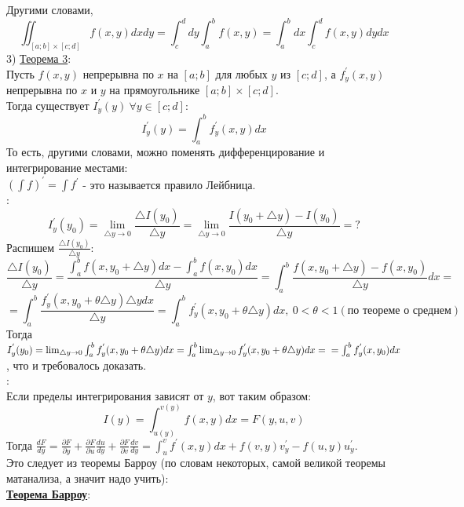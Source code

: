 \documentclass[12pt]{article}
\begin{document}
Другими словами,\\ $$\iint_{[a;b]\times [c;d]} f(x,y) dxdy = \int_c^d dy \int_a^b f(x,y) = \int_a^b dx \int_c^d f(x,y) dydx$$
3) \uline{Теорема 3}:\\
Пусть $f(x,y)$ непрерывна по $x$ на $[a;b]$ для любых $y$ из $[c;d]$, а $f^{'}_y(x,y)$ непрерывна по $x$ и $y$ на прямоугольнике $[a;b] \times [c;d]$.\\
Тогда существует $I^{'}_y (y) \ \forall y\in [c;d]$:\\
$$I^{'}_y (y) = \int_a^b f^{'}_y (x,y) dx$$
То есть, другими словами, можно поменять дифференцирование и интегрирование местами:\\
$(\int f)^{'} = \int f^{'}$ - это называется правило Лейбница.\\
:\\
$$I^{'}_y(y_0) = \lim_{{\bigtriangleup y} \to 0} \frac{{\bigtriangleup I(y_0)}}{{\bigtriangleup y}} = \lim_{{\bigtriangleup y} \to 0} \frac{I(y_0+{\bigtriangleup y}) - I(y_0)}{{\bigtriangleup y}} = ?$$
Распишем $\frac{{\bigtriangleup I(y_0)}}{{\bigtriangleup y}}$:\\
$$\frac{{\bigtriangleup I(y_0)}}{{\bigtriangleup y}} = \frac{\int_a^b f(x, y_0 + {\bigtriangleup y}) dx - \int_a^b f(x,y_0) dx}{{\bigtriangleup y}} = \int_a^b \frac{f(x,y_0+{\bigtriangleup y}) - f(x,y_0)}{{\bigtriangleup y}} dx =$$
$$= \int_a^b \frac{f^{'}_y (x, y_0 + \theta {\bigtriangleup y}) {\bigtriangleup y} dx}{{\bigtriangleup y}} = \int_a^b f^{'}_y (x, y_0 + \theta {\bigtriangleup y}) dx, \ 0 < \theta < 1 (\text{по теореме о среднем})$$
Тогда $I^{'}_y (y_0) = \lim_{{\bigtriangleup y} \to 0} \int_a^b f^{'}_y (x, y_0 + \theta {\bigtriangleup y}) dx = \int_a^b \lim_{{\bigtriangleup y} \to 0}  f^{'}_y (x, y_0 + \theta {\bigtriangleup y}) dx =\\= \int_a^b f^{'}_y (x,y_0) dx$, что и требовалось доказать.\\
:\\
Если пределы интегрирования зависят от $y$, вот таким образом:\\
$$I(y) = \int_{u(y)}^{v(y)} f(x,y) dx = F(y,u,v)$$
Тогда $\frac{dF}{dy} = \frac{\partial F}{\partial y} + \frac{\partial F}{\partial u} \frac{du}{dy} + \frac{\partial F}{\partial v} \frac{dv}{dy} = \int_u^v f^{'}(x,y) dx + f(v,y) v^{'}_y - f(u,y) u^{'}_y$.\\
Это следует из теоремы Барроу (по словам некоторых, самой великой теоремы матанализа, а значит надо учить):\\
\uline{\textbf{Теорема Барроу}}:\\
\end{document}
